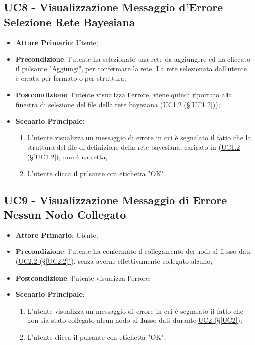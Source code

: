 \pagebreak

\subsection{UC8 - Visualizzazione Messaggio d'Errore Selezione Rete Bayesiana}\label{UC8}
\begin{itemize}
\item \textbf{Attore Primario}: Utente;
\item \textbf{Precondizione}: l'utente ha selezionato una rete da aggiungere ed ha cliccato il pulsante "Aggiungi", per confermare la rete. La rete selezionata dall'utente è errata per formato o per struttura;
\item \textbf{Postcondizione}: l'utente visualizza l'errore, viene quindi riportato alla finestra di selezione del file della rete bayesiana (\hyperref[UC1.2]{UC1.2 (§\ref*{UC1.2})});
\item \textbf{Scenario Principale:} 
	\begin{enumerate}
	\item L'utente visualizza un messaggio di errore in cui è segnalato il fatto che la struttura del file di definizione della rete bayesiana, caricato in (\hyperref[UC1.2]{UC1.2 (§\ref*{UC1.2})}, non è corretta;
	\item L'utente clicca il pulsante con etichetta "OK".
	\end{enumerate}
\end{itemize}

\pagebreak

\subsection{UC9 - Visualizzazione Messaggio di Errore Nessun Nodo Collegato}\label{UC9}
\begin{itemize}
\item \textbf{Attore Primario}: Utente;
\item \textbf{Precondizione}: l'utente ha confermato il collegamento dei nodi al flusso dati (\hyperref[UC2.2]{UC2.2 (§\ref*{UC2.2})}), senza averne effettivamente collegato alcuno;
\item \textbf{Postcondizione}: l'utente visualizza l'errore;
\item \textbf{Scenario Principale}: 
	\begin{enumerate}
	\item L'utente visualizza un messaggio di errore in cui è segnalato il fatto che non sia stato collegato alcun 				nodo al flusso dati durante \hyperref[UC2]{UC2 (§\ref*{UC2})};
	\item L'utente clicca il pulsante con etichetta "OK".
	\end{enumerate}
\end{itemize}

